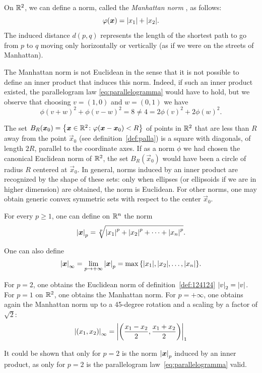 \begin{example}
On ${\mathbb R}^2$, we can define a norm, called the \emph{Manhattan norm}%
%
,
as follows:
\[
  \varphi(\boldsymbol x) = {\left|x_1\right|} + {\left|x_2\right|}.
\]
The induced distance $d(p,q)$
%
%
represents the length of the shortest path to
go from $p$ to $q$ moving only horizontally or vertically
(as if we were on the streets of Manhattan).

The Manhattan norm is not Euclidean in the sense that it is not possible to
define
an inner product that induces this norm. Indeed, if such an
inner product existed, the parallelogram law
\eqref{eq:parallelogramma} would have to hold, but we observe that choosing $v=(1,0)$ and $w=(0,1)$
we have
\[
  \phi(v+w)^2 + \phi(v-w)^2
  = 8
  \neq 4
  = 2\phi(v)^2 + 2\phi(w)^2.
\]

The set $B_R(\boldsymbol x_0) = {\left\{ \boldsymbol x \in {\mathbb R}^2\colon \varphi(\boldsymbol x-\boldsymbol x_0) <
R \right\}}$
of points in ${\mathbb R}^2$ that are less than $R$ away from the point $\vec x_0$
(see definition~\ref{def:palla})
is a square
with diagonals, of length $2R$, parallel to the coordinate axes.
If as a norm $\phi$ we had chosen the canonical Euclidean norm of ${\mathbb R}^2$,
the set $B_R(\vec x_0)$ would have been a circle of radius $R$
centered at $\vec x_0$.
In general, norms induced by an inner product are recognized
by the shape of these sets: only when ellipses
(or ellipsoids if we are in higher dimension) are obtained, the norm is
Euclidean.
For other norms, one may obtain generic convex symmetric sets
with respect to the center $\vec x_0$.
\end{example}

\begin{example}[$p$-norm]
\label{ex:norma_p}%
For every $p\ge 1$, one can define on ${\mathbb R}^n$ the norm
%
%
%
\[
  {\left|\boldsymbol x\right|}_p = \sqrt[p]{{\left|x_1\right|}^p + {\left|x_2\right|}^p + \dots + {\left|x_n\right|}^p}.
\]

One can also define
\[
  {\left|\boldsymbol x\right|}_\infty = \lim_{p\to +\infty} {\left|\boldsymbol x\right|}_p
   = \max{\left\{ {\left|x_1\right|}, {\left|x_2\right|}, \dots, {\left|x_n\right|} \right\}}.
\]

For $p=2$, one obtains the Euclidean norm of definition~\ref{def:124124}
${\left|v\right|}_2={\left|v\right|}$.
For $p=1$
on ${\mathbb R}^2$, one obtains the Manhattan norm.
For $p=+\infty$, one obtains again
the Manhattan norm up to a 45-degree rotation and a scaling
by a factor of $\sqrt 2$:
\[
  {\left|(x_1,x_2)\right|}_\infty
  = {\left|{\left( \frac{x_1-x_2} 2, \frac {x_1+x_2}2 \right)}\right|}_1
\]

It could be shown that only for $p=2$ is the norm ${\left|\boldsymbol x\right|}_p$ induced
by an inner product, as only for $p=2$ is the
parallelogram law~\eqref{eq:parallelogramma} valid.
\end{example}